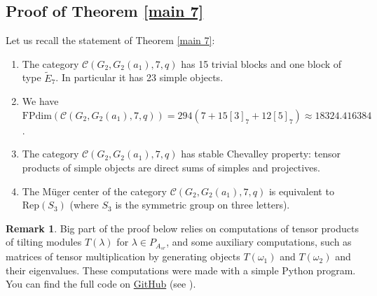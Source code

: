 \documentclass{amsart}
\theoremstyle{definition}
\newtheorem{remark}[theorem]{Remark}
\newcommand{\C}{\mathcal{C}}
\newcommand{\FP}{\text{FPdim}}
\newcommand{\Rep}{\text{Rep}}
\numberwithin{equation}{section}
\begin{document}
\subsection{Proof of Theorem \ref{main 7}} \label{{section: proof of theorem 1.3}}
Let us recall the statement of Theorem \ref{main 7}:
\begin{enumerate}
    \item  The category $\C(G_2,G_2(a_1),7,q)$ has 15 trivial blocks and one block of type $\tilde E_7$.
In particular it has 23 simple objects.

\item We have $\FP(\C(G_2,G_2(a_1),7,q))=294(7+15[3]_7+12[5]_7)\approx 18324.416384$.

\item The category $\C(G_2,G_2(a_1),7,q)$ has stable Chevalley property: tensor products of simple 
objects are direct sums of simples and projectives.

\item The M\"uger center of the category $\C(G_2,G_2(a_1),7,q)$ is equivalent to $\Rep(S_3)$
(where $S_3$ is the symmetric group on three letters).
\end{enumerate}

\begin{remark}
    Big part of the proof below relies on computations of tensor products of tilting modules $T(\lambda)$ for $\lambda\in P_{A_{sr}}$, and some auxiliary computations, such as matrices of tensor multiplication by generating objects $T(\omega_1)$ and $T(\omega_2)$ and their eigenvalues. These computations were made with a simple Python program. You can find the full code on \href{https://github.com/autiralova/A-non-semisimple-Witt-class-code}{GitHub} (see \cite{OU}).
\end{remark}
\end{document}
